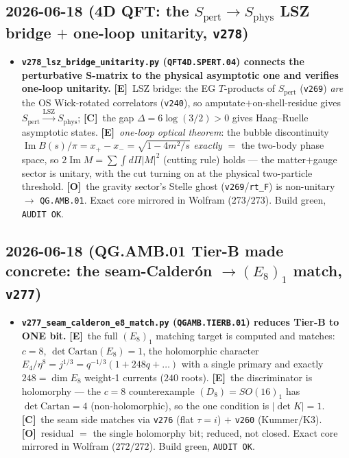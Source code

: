 \documentclass[11pt]{article}
\providecommand{\mE}{\textbf{[E]}}\providecommand{\mC}{\textbf{[C]}}
\providecommand{\mO}{\textbf{[O]}}\providecommand{\mX}{\textbf{[X]}}
\providecommand{\vref}[1]{\texttt{#1}}
\begin{document}
\subsection*{2026-06-18 (4D QFT: the $S_{\mathrm{pert}}\to S_{\mathrm{phys}}$ LSZ bridge $+$ one-loop unitarity, \texttt{v278})}
\begin{itemize}
\item \textbf{\texttt{v278\_lsz\_bridge\_unitarity.py} (\texttt{QFT4D.SPERT.04}) connects the perturbative
  S-matrix to the physical asymptotic one and verifies one-loop unitarity.} \mE\ LSZ bridge: the EG
  $T$-products of $S_{\mathrm{pert}}$ (\vref{v269}) \emph{are} the OS Wick-rotated correlators (\vref{v240}), so
  amputate$+$on-shell-residue gives $S_{\mathrm{pert}}\xrightarrow{\mathrm{LSZ}}S_{\mathrm{phys}}$; \mC\ the gap
  $\Delta{=}6\log(3/2){>}0$ gives Haag--Ruelle asymptotic states. \mE\ \emph{one-loop optical theorem}: the
  bubble discontinuity $\operatorname{Im}B(s)/\pi=x_+{-}x_-=\sqrt{1-4m^2/s}$ \emph{exactly} $=$ the two-body
  phase space, so $2\operatorname{Im}M=\sum\!\int d\Pi|M|^2$ (cutting rule) holds --- the matter$+$gauge sector
  is unitary, with the cut turning on at the physical two-particle threshold. \mO\ the gravity sector's Stelle
  ghost (\vref{v269}/\texttt{rt\_F}) is non-unitary $\to$ \texttt{QG.AMB.01}. Exact core mirrored in Wolfram
  ($273/273$). Build green, \texttt{AUDIT OK}.
\end{itemize}

\subsection*{2026-06-18 (QG.AMB.01 Tier-B made concrete: the seam-Calder\'on $\to(E_8)_1$ match, \texttt{v277})}
\begin{itemize}
\item \textbf{\texttt{v277\_seam\_calderon\_e8\_match.py} (\texttt{QGAMB.TIERB.01}) reduces Tier-B to ONE bit.}
  \mE\ the full $(E_8)_1$ matching target is computed and matches: $c{=}8$, $\det\mathrm{Cartan}(E_8){=}1$, the
  holomorphic character $E_4/\eta^8{=}j^{1/3}{=}q^{-1/3}(1{+}248q{+}\dots)$ with a single primary and exactly
  $248{=}\dim E_8$ weight-1 currents ($240$ roots). \mE\ the discriminator is holomorphy --- the $c{=}8$
  counterexample $(D_8){=}SO(16)_1$ has $\det\mathrm{Cartan}{=}4$ (non-holomorphic), so the one condition is
  $|\det K|{=}1$. \mC\ the seam side matches via \vref{v276} (flat $\tau{=}i$) $+$ \vref{v260} (Kummer/K3).
  \mO\ residual $=$ the single holomorphy bit; reduced, not closed. Exact core mirrored in Wolfram
  ($272/272$). Build green, \texttt{AUDIT OK}.
\end{itemize}
\end{document}
